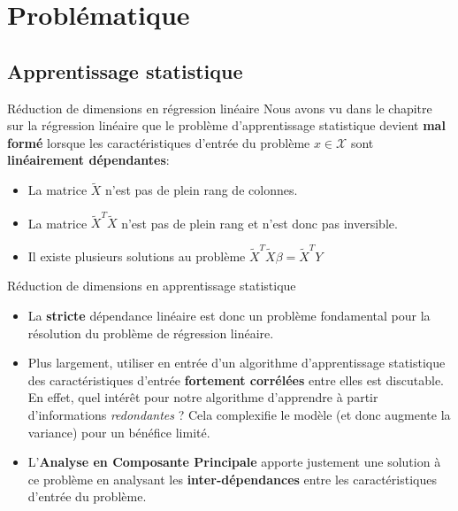 \section[Problématique]{Problématique}

\subsection[Apprentissage statistique]{Apprentissage statistique}

\begin{frame}{Réduction de dimensions en régression linéaire}
	Nous avons vu dans le chapitre sur la régression linéaire que le problème d'apprentissage statistique devient \textbf{mal formé} lorsque les caractéristiques d'entrée du problème $x \in \mathcal{X}$ sont \textbf{linéairement dépendantes}:
	\begin{itemize}
		\item La matrice $\tilde{X}$ n'est pas de plein rang de colonnes.
		\item La matrice $\tilde{X}^T \tilde{X}$ n'est pas de plein rang et n'est donc pas inversible.
		\item Il existe plusieurs solutions au problème $\tilde{X}^T \tilde{X} \beta = \tilde{X}^T Y$
	\end{itemize}
\end{frame}

\begin{frame}{Réduction de dimensions en apprentissage statistique}
	\begin{itemize}
		\item La \textbf{stricte} dépendance linéaire est donc un problème fondamental pour la résolution du problème de régression linéaire.
		\pause 
		\item Plus largement, utiliser en entrée d'un algorithme d'apprentissage statistique des caractéristiques d'entrée \textbf{fortement corrélées} entre elles est discutable. En effet, quel intérêt pour notre algorithme d'apprendre à partir d'informations \textit{redondantes} ? Cela complexifie le modèle (et donc augmente la variance) pour un bénéfice limité.
		\pause
		\item L'\textbf{Analyse en Composante Principale} apporte justement une solution à ce problème en analysant les \textbf{inter-dépendances} entre les caractéristiques d'entrée du problème.
	\end{itemize}
\end{frame}


